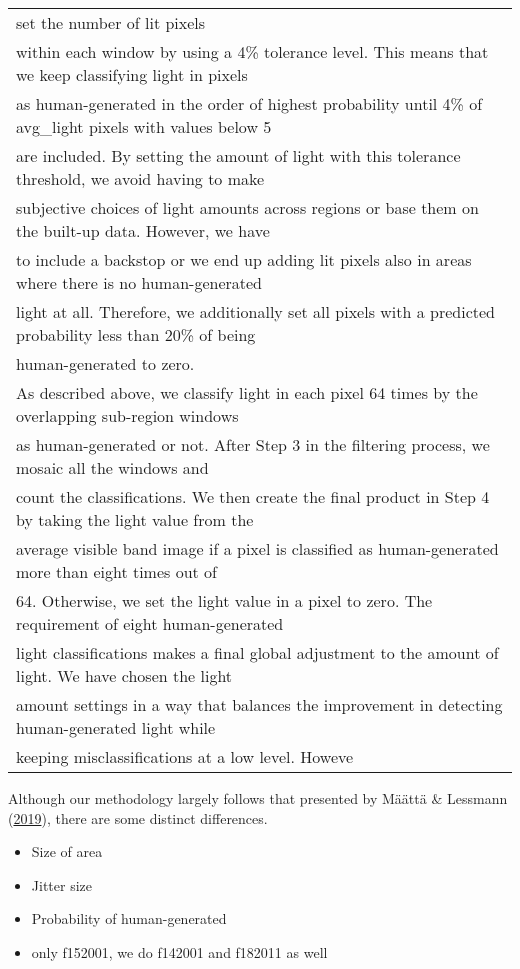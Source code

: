 \documentclass[11pt,preprint, authoryear]{elsarticle}
\numberwithin{equation}{section}
\numberwithin{figure}{section}
\numberwithin{table}{section}
\def\tightlist{} %
\begin{document}
\begin{longtable}[]{@{}l@{}}
set the number of lit pixels \\
within each window by using a 4\% tolerance level. This means that we
keep classifying light in pixels \\
as human-generated in the order of highest probability until 4\% of
avg\_light pixels with values below 5 \\
are included. By setting the amount of light with this tolerance
threshold, we avoid having to make \\
subjective choices of light amounts across regions or base them on the
built-up data. However, we have \\
to include a backstop or we end up adding lit pixels also in areas where
there is no human-generated \\
light at all. Therefore, we additionally set all pixels with a predicted
probability less than 20\% of being \\
human-generated to zero. \\
As described above, we classify light in each pixel 64 times by the
overlapping sub-region windows \\
as human-generated or not. After Step 3 in the filtering process, we
mosaic all the windows and \\
count the classifications. We then create the final product in Step 4 by
taking the light value from the \\
average visible band image if a pixel is classified as human-generated
more than eight times out of \\
64. Otherwise, we set the light value in a pixel to zero. The
requirement of eight human-generated \\
light classifications makes a final global adjustment to the amount of
light. We have chosen the light \\
amount settings in a way that balances the improvement in detecting
human-generated light while \\
keeping misclassifications at a low level. Howeve \\
\bottomrule
\end{longtable}

Although our methodology largely follows that presented by Määttä \&
Lessmann (\protect\hyperlink{ref-maatta}{2019}), there are some distinct
differences.

\begin{itemize}
\tightlist
\item
  Size of area
\item
  Jitter size
\item
  Probability of human-generated
\item
  only f152001, we do f142001 and f182011 as well
\end{itemize}
\end{document}
